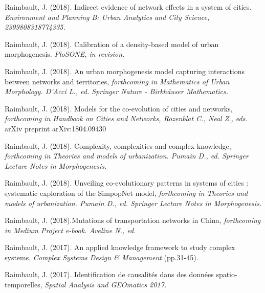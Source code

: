 \noindent Raimbault, J. (2018). Indirect evidence of network effects in a system of cities. \textit{Environment and Planning B: Urban Analytics and City Science, 2399808318774335.}

\bigskip


\noindent Raimbault, J. (2018). Calibration of a density-based model of urban morphogenesis. \textit{PloSONE, in revision.}

\bigskip

\noindent Raimbault, J. (2018). An urban morphogenesis model capturing interactions between networks and territories, \textit{forthcoming in Mathematics of Urban Morphology. D'Acci L., ed. Springer Nature - Birkhäuser Mathematics.}

\bigskip

\noindent Raimbault, J. (2018). Models for the co-evolution of cities and networks, \textit{forthcoming in Handbook on Cities and Networks, Rozenblat C., Neal Z., eds.} arXiv preprint arXiv:1804.09430

\bigskip

\noindent Raimbault, J. (2018). Complexity, complexities and complex knowledge, \textit{forthcoming in Theories and models of urbanization. Pumain D., ed. Springer Lecture Notes in Morphogenesis.}

\bigskip

\noindent Raimbault, J. (2018). Unveiling co-evolutionary patterns in systems of cities : systematic exploration of the SimpopNet model, \textit{forthcoming in Theories and models of urbanization. Pumain D., ed. Springer Lecture Notes in Morphogenesis.}

\bigskip

\noindent Raimbault, J. (2018).Mutations of transportation networks in China, \textit{forthcoming in Medium Project e-book. Aveline N., ed.}

\bigskip

\noindent Raimbault, J. (2017). An applied knowledge framework to study complex systems, \textit{Complex Systems Design \& Management} (pp.31-45).

\bigskip

\noindent Raimbault, J. (2017). Identification de causalités dans des données spatio-temporelles, \textit{Spatial Analysis and GEOmatics 2017.}



\bigskip

